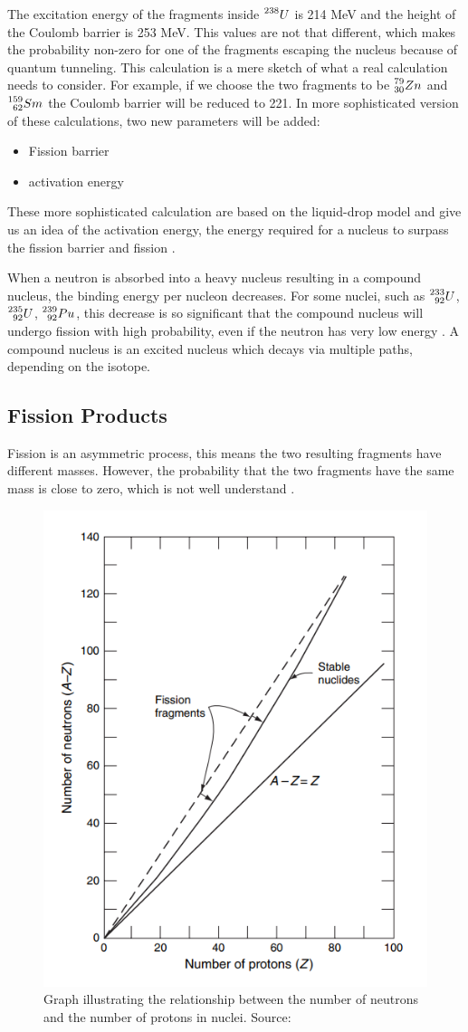 The excitation energy of the fragments inside $\prescript{238}{}{U}$ is 214 MeV and the height of the Coulomb barrier is 253 MeV. This values are not that different, which  makes the probability non-zero for one of the fragments escaping the nucleus because of quantum tunneling. This calculation is a mere sketch  of what a real calculation needs to consider. For example, if we choose the two fragments to be $\prescript{79}{30}{Zn}$ and $\prescript{159}{62}{Sm}$ the Coulomb barrier will be reduced to 221. In more sophisticated version of these calculations, two new parameters will be added:

\begin{itemize}
    \item Fission barrier 
    \item activation energy
\end{itemize}

These more sophisticated calculation are based on the liquid-drop model and give us an idea of the activation energy, the energy required for a nucleus to surpass the fission barrier and fission \cite{Krane}.

When a neutron is absorbed into a heavy nucleus resulting in a compound nucleus, the binding energy per nucleon decreases. For some nuclei, such as $\prescript{233}{92}{U}$, $\prescript{235}{92}{U}$, $\prescript{239}{92}{Pu}$, this decrease is so significant that the compound nucleus will undergo fission with high probability, even if the neutron has very low energy \cite{Stacey_2010}. A compound nucleus is an excited nucleus which decays via multiple paths, depending on the isotope.

\subsection{Fission Products}
Fission is an asymmetric process, this means the two resulting fragments have different masses. However, the probability that the two fragments have the same mass is close to zero, which is not well understand \cite{Notas_sanabricas}. 

\begin{figure}[h]
    \centering
    \includegraphics[width=0.5\linewidth]{Kap2/Figures/stability_curve.png}
    \caption{Graph illustrating the relationship between the number of neutrons and the number of protons in nuclei. Source: \cite{Lewis_2014}}
    \label{fig:Stability_curve}
\end{figure}

